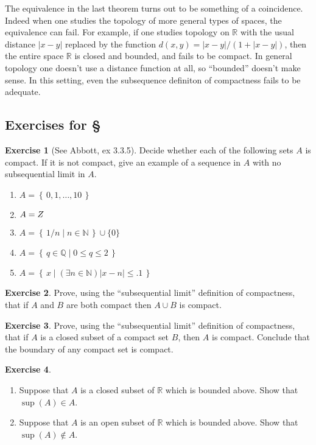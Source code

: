 \documentclass[11pt,oneside]{amsbook}
\newcommand{\set}[1]{\left\{\,#1\,\right\}}
\newcommand{\NN}{\mathbb N}
\newcommand{\ZZ}{\mathbb Z}
\newcommand{\QQ}{\mathbb Q}
\newcommand{\RR}{\mathbb R}
\theoremstyle{definition}
\newtheorem{exerc}{Exercise}[section]
\theoremstyle{plain}
\theoremstyle{definition}
\theoremstyle{remark}
\numberwithin{equation}{section}
\numberwithin{figure}{section}
\begin{document}
The equivalence in the last theorem turns out to be something of a coincidence. Indeed when one studies the topology of more general types of spaces, the equivalence can fail. For example, if one studies topology on $\RR$ with the usual distance $|x-y|$ replaced by the function $d(x,y)=|x-y|/(1+|x-y|)$, then the entire space $\RR$ is closed and bounded, and fails to be compact. In general topology one doesn't use a distance function at all, so ``bounded'' doesn't make sense. In this setting, even the subsequence definiton of compactness fails to be adequate.

\newpage
\subsection*{Exercises for \S \thesection}

\begin{exerc}[See Abbott, ex 3.3.5]
  Decide whether each of the following sets $A$ is compact. If it is not compact, give an example of a sequence in $A$ with no subsequential limit in $A$.
  \begin{enumerate}
    \item $A=\set{0,1,\ldots,10}$
    \item $A=\mathbb\ZZ$
    \item $A=\set{1/n\mid n\in\NN}\cup\{0\}$
    \item $A=\set{q\in\QQ\mid0\leq q\leq2}$
    \item $A=\set{x\mid (\exists n\in\NN) |x-n|\leq.1}$
  \end{enumerate}
\end{exerc}

\begin{exerc}
  Prove, using the ``subsequential limit'' definition of compactness, that if $A$ and $B$ are both compact then $A\cup B$ is compact.
\end{exerc}

\begin{exerc}
  Prove, using the ``subsequential limit'' definition of compactness, that if $A$ is a closed subset of a compact set $B$, then $A$ is compact. Conclude that the boundary of any compact set is compact.
\end{exerc}

\begin{exerc}
  \begin{enumerate}
    \item Suppose that $A$ is a closed subset of $\RR$ which is bounded above. Show that $\sup(A)\in A$.
    \item Suppose that $A$ is an open subset of $\RR$ which is bounded above. Show that $\sup(A)\notin A$.
  \end{enumerate}
\end{exerc}
\end{document}
